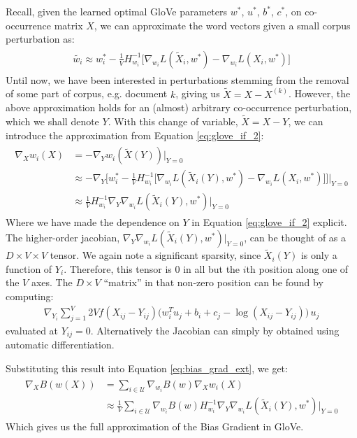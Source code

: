 \documentclass{article}
\begin{document}
Recall, given the learned optimal GloVe parameters $w^*$, $u^*$, $b^*$, $c^*$, on co-occurrence matrix $X$, we can approximate the word vectors given a small corpus perturbation as:
\begin{align}
\begin{split}
\label{eq:glove_if_2}
\tilde{w_i} \approx w_i^* - \frac{1}{V} H_{w_i}^{-1}\big[\nabla_{w_i} L(\tilde{X}_i, w^*) - \nabla_{w_i}L(X_i, w^*)\big]
\end{split}
\end{align}
Until now, we have been interested in perturbations stemming from the removal of some part of corpus, e.g. document $k$, giving us $\tilde{X} = X - X^{(k)}$. However, the above approximation holds for an (almost) arbitrary co-occurrence perturbation, which we shall denote $Y$. With this change of variable, $\tilde{X} = X - Y$, we can introduce the approximation from Equation \eqref{eq:glove_if_2}:
\begin{align}
\begin{split}
\label{eq:glove_if_grad}
\nabla_{X} w_i(X) &= -\nabla_{Y}w_i(\tilde{X}(Y))\rvert_{Y=0} \\
                &\approx -\nabla_{Y} \Big[w_i^* - \frac{1}{V} H_{w_i}^{-1}\big[\nabla_{w_i} L(\tilde{X}_i(Y), w^*) - \nabla_{w_i}L(X_i, w^*)\big]\Big]\rvert_{Y=0}\\
                &\approx \frac{1}{V} H_{w_i}^{-1} \nabla_{Y} \nabla_{w_i} L(\tilde{X}_i(Y), w^*)\rvert_{Y=0}
\end{split}
\end{align}
Where we have made the dependence on $Y$ in Equation \eqref{eq:glove_if_2} explicit. 
The higher-order jacobian, $\nabla_{Y} \nabla_{w_i} L(\tilde{X}_i(Y), w^*)\rvert_{Y=0}$, can be thought of as a $D \times V \times V$ tensor.
We again note a significant sparsity, since $\tilde{X}_i(Y)$ is only a function of $Y_i$.
Therefore, this tensor is $0$ in all but the $i$th position along one of the $V$ axes. The $D \times V$ ``matrix'' in that non-zero position can be found by computing:
\begin{align*}
\nabla_{Y_i}\sum_{j=1}^V 2V f(X_{ij}-Y_{ij}) \big(w_i ^T u_j + b_i + c_j - \log (X_{ij}-Y_{ij})\big)\,u_j
\end{align*}
evaluated at $Y_{ij} = 0$. Alternatively the Jacobian can simply by obtained using automatic differentiation.

Substituting this result into Equation \eqref{eq:bias_grad_ext}, we get:
\begin{align*}
\begin{split}
\nabla_{X} B(w(X)) &= \sum_{i \in \mathcal{U}} \nabla_{w_i} B(w) \nabla_{X} w_i(X) \\
    &\approx \frac{1}{V}\sum_{i \in \mathcal{U}} \nabla_{w_i} B(w) H_{w_i}^{-1} \nabla_{Y} \nabla_{w_i} L(\tilde{X}_i(Y), w^*)\rvert_{Y=0}
\end{split}
\end{align*}
Which gives us the full approximation of the Bias Gradient in GloVe. 
\end{document}
